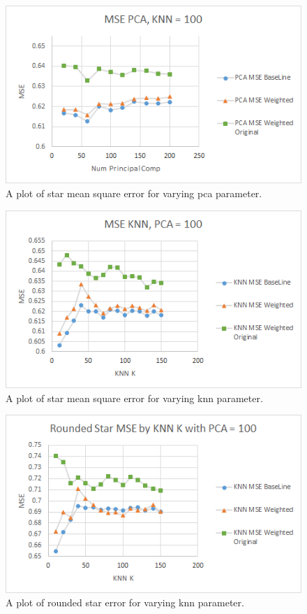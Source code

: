 \documentclass[10pt,twocolumn,letterpaper]{article}
\begin{document}
\begin{figure}[t]
\begin{center}
   \includegraphics[width=0.9\linewidth]{pcaMSE.png}
\end{center}
   \caption{A plot of star mean square error for varying pca parameter.}
\label{fig:pcaMSE}
\end{figure}

\begin{figure}[t]
\begin{center}
   \includegraphics[width=0.9\linewidth]{knnMSE.png}
\end{center}
   \caption{A plot of star mean square error for varying knn parameter.}
\label{fig:knnMSE}
\end{figure}

\begin{figure}[t]
\begin{center}
   \includegraphics[width=0.9\linewidth]{knnErr.png}
\end{center}
   \caption{A plot of rounded star error for varying knn parameter.}
\label{fig:knnErr}
\end{figure}
\end{document}
